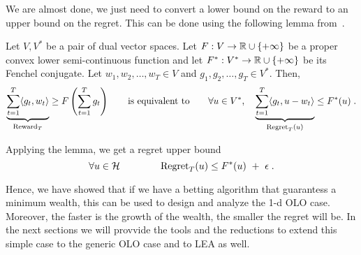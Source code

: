 We are almost done, we just need to convert a lower bound on the reward to an upper bound
on the regret. This can be done using the following lemma from~\cite{McMahanO14}.
\begin{lemma}
\label{lemma:reward-regret}
Let $V,V^*$ be a pair of dual vector spaces. Let $F:V \to \mathbb{R} \cup \{+\infty\}$
be a proper convex lower semi-continuous function and let $F^*:V^* \to \mathbb{R} \cup
\{+\infty\}$ be its Fenchel conjugate. Let $w_1, w_2, \dots, w_T \in V$ and
$g_1, g_2, \dots, g_T \in V^*$.  Then,
\[
\underbrace{\sum_{t=1}^T \langle g_t, w_t \rangle}_{\operatorname{Reward}_T} \ge F\left( \sum_{t=1}^T g_t \right)
\qquad \text{is equivalent to} \qquad
\forall u \in V^*, \quad
\underbrace{\sum_{t=1}^T \langle g_t, u - w_t\rangle}_{\operatorname{Regret}_T(u)} \le F^*(u) \; .
\]
\end{lemma}

Applying the lemma, we get a regret upper bound
\[
\forall u \in \mathcal{H} \qquad \qquad
\operatorname{Regret}_T(u) \le F^*(u) \ + \ \epsilon \; .
\]

Hence, we have showed that if we have a betting algorithm that guarantess a minimum wealth, this can be used to design and analyze the 1-d \ac{OLO} case. Moreover, the faster is the growth of the wealth, the smaller the regret will be.
In the next sections we will provvide the tools and the reductions to extend this simple case to the generic \ac{OLO} case and to \ac{LEA} as well.
